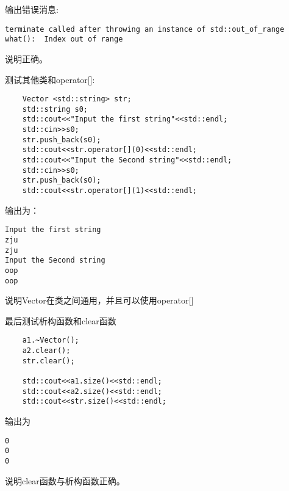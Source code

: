 \documentclass{ctexart} %
\begin{document}
\noindent 输出错误消息:
\begin{verbatim}
terminate called after throwing an instance of std::out_of_range
what():  Index out of range
\end{verbatim}

\vspace{10pt}

说明正确。

测试其他类和operator[]:
\begin{lstlisting}
    Vector <std::string> str;
    std::string s0;
    std::cout<<"Input the first string"<<std::endl;
    std::cin>>s0;
    str.push_back(s0);
    std::cout<<str.operator[](0)<<std::endl;
    std::cout<<"Input the Second string"<<std::endl;
    std::cin>>s0;
    str.push_back(s0);
    std::cout<<str.operator[](1)<<std::endl;
\end{lstlisting}
输出为：
\begin{verbatim}
Input the first string
zju
zju
Input the Second string
oop
oop
\end{verbatim}

说明Vector在类之间通用，并且可以使用operator[]


\vspace{10pt}

最后测试析构函数和clear函数
\begin{verbatim}
    a1.~Vector();
    a2.clear();
    str.clear();

    std::cout<<a1.size()<<std::endl;
    std::cout<<a2.size()<<std::endl;
    std::cout<<str.size()<<std::endl;
\end{verbatim}

输出为
\begin{verbatim}
0
0
0
\end{verbatim}
说明clear函数与析构函数正确。
\end{document}

